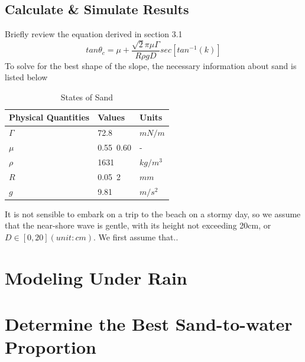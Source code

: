 \documentclass[12pt]{article}
\begin{document}
\subsection{Calculate \& Simulate Results}
Briefly review the equation derived in section 3.1
$$tan\theta_c = \mu + \frac{\sqrt{2}\pi\mu\Gamma}{R\rho gD}sec[tan^{-1}(k)]$$
To solve for the best shape of the slope, the necessary information about sand is listed below
\begin{table}[H]
    \caption{States of Sand}
    \vspace{10pt}
    \centering
    \begin{tabular}{p{4cm}p{2cm}p{2cm}}
        \hline
        Physical Quantities & Values    & Units    \\
        \hline
        $\Gamma$            & 72.8      & $mN/m$   \\
        $\mu$               & 0.55~0.60 & -        \\
        $\rho$              & 1631      & $kg/m^3$ \\
        $R$                 & 0.05~2    & $mm$     \\
        $g$                 & 9.81      & $m/s^2$  \\
        \hline
    \end{tabular}
    \label{bs2}
\end{table}
\par
It is not sensible to embark on a trip to the beach on a stormy day, so we assume that the near-shore wave is gentle, with its height not exceeding 20cm, or $D \in [0, 20](unit:cm)$.
We first assume that..

\section{Modeling Under Rain}

\section{Determine the Best Sand-to-water Proportion}
\end{document}
